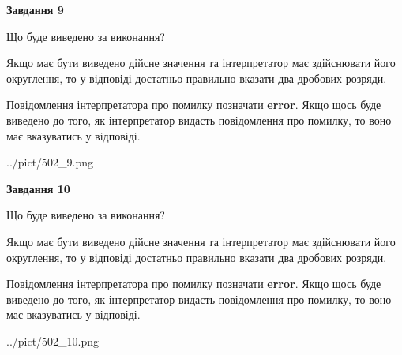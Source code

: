 \documentclass[12pt, ukrainian]{article}
\begin{document}
{\begin {Large}
{\begin {center}\textbf{Завдання 9}\end {center}}\par
Що буде виведено за виконання? \par

Якщо має бути виведено дійсне значення та інтерпретатор має здійснювати його округлення, 
то у відповіді достатньо правильно вказати два дробових розряди.

Повідомлення інтерпретатора про помилку позначати \textbf{error}.
Якщо щось буде виведено до того, як інтерпретатор видасть повідомлення про помилку, 
то воно має вказуватись у відповіді. \par

\begin{center}
	{../pict/502_9.png}
\end{center}
\newpage

{\begin {center}\textbf{Завдання 10}\end {center}}\par
Що буде виведено за виконання? \par

Якщо має бути виведено дійсне значення та інтерпретатор має здійснювати його округлення, 
то у відповіді достатньо правильно вказати два дробових розряди.

Повідомлення інтерпретатора про помилку позначати \textbf{error}.
Якщо щось буде виведено до того, як інтерпретатор видасть повідомлення про помилку, 
то воно має вказуватись у відповіді. \par

\begin{center}
	{../pict/502_10.png}
\end{center}
\newpage

\end {Large}}
\end{document}
